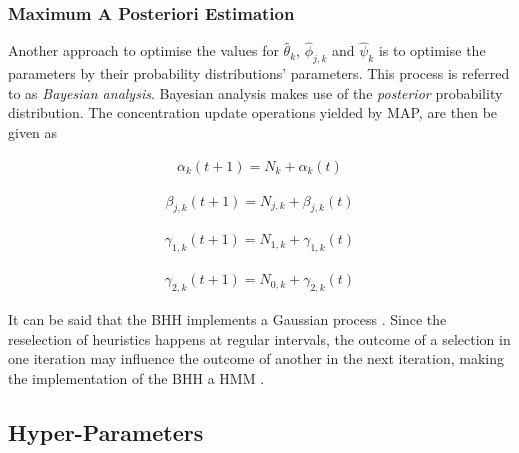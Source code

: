 \subsubsection{Maximum A Posteriori Estimation}\label{sec:bhh:optimisation_step:map}

Another approach to optimise the values for $\hat{\theta}_{k}$, $\hat{\phi}_{j,k}$ and $\hat{\psi}_{k}$ is to optimise the parameters by their probability distributions' parameters. This process is referred to as \textit{Bayesian analysis}. Bayesian analysis makes use of the \textit{posterior} probability distribution. The concentration update operations yielded by \acs{MAP}, are then be given as

\begin{equation}
	\label{eq:bhh:optimisation_step:map:alpha_update_operation}
	\begin{split}
		\alpha_{k}(t+1) = N_{k} + \alpha_{k}(t)
	\end{split}
\end{equation}

\begin{equation}
	\label{eq:bhh:optimisation_step:map:beta_update_operation}
	\begin{split}
		\beta_{j,k}(t+1) = N_{j,k} + \beta_{j,k}(t)
	\end{split}
\end{equation}

\begin{equation}
	\label{eq:bhh:optimisation_step:map:gamma1_update_operation}
	\begin{split}
		\gamma_{1,k}(t+1) = N_{1,k} + \gamma_{1,k}(t)
	\end{split}
\end{equation}

\begin{equation}
	\label{eq:bhh:optimisation_step:map:gamma2_update_operation}
	\begin{split}
		\gamma_{2,k}(t+1) = N_{0,k} + \gamma_{2,k}(t)
	\end{split}
\end{equation}

It can be said that the \acs{BHH} implements a Gaussian process \cite{ref:gortler:2019}. Since the reselection of heuristics happens at regular intervals, the outcome of a selection in one iteration may influence the outcome of another in the next iteration, making the implementation of the \acs{BHH} a \acs{HMM} \cite{ref:rabiner:1986}.


\subsection{Hyper-Parameters}\label{sec:bhh:hyper_parameters}

